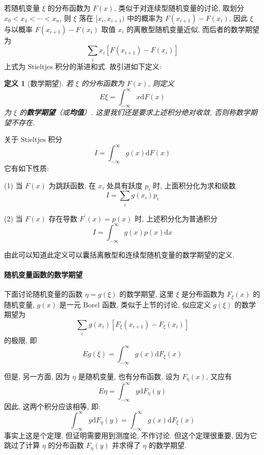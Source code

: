 \documentclass[12pt,a4paper]{article}
\newtheorem{definition}{定义}[subsection] %
\begin{document}
若随机变量 $\xi$ 的分布函数为 $F(x)$, 类似于对连续型随机变量的讨论, 取划分 $x_0 < x_1< \cdots< x_n$, 则 $\xi$ 落在
$[x_i, x_{i+1})$ 中的概率为 $F(x_{i+1})-F(x_i)$, 因此 $\xi$ 与以概率 $F(x_{i+1}) - F(x_i)$ 取值 $x_i$ 的离散型随机变量近似, 而后者的数学期望为
\[\sum\limits_i x_i[F(x_{i+1}) - F(x_i)]\]
上式为 $\mathrm{Stieltjes}$ 积分的渐进和式. 故引进如下定义:
\begin{definition}[数学期望]
    若 $\xi$ 的分布函数为 $F(x)$, 则定义 \[E\xi = \int_{-\infty}^{\infty} x \mathrm{d}F(x)\]
    为 $\xi$ 的\textbf{数学期望}（或\textbf{均值}）. 这里我们还是要求上述积分绝对收敛, 否则称数学期望不存在.
\end{definition}
关于 $\mathrm{Stieltjes}$ 积分 \[I = \int_{-\infty}^{\infty} g(x) \mathrm{d}F(x)\] 它有如下性质:

(1) 当 $F(x)$ 为跳跃函数, 在 $x_i$ 处具有跃度 $p_i$ 时, 上面积分化为求和级数\[I = \sum\limits_{i} g(x_i)p_i\]

(2) 当 $F(x)$ 存在导数 $F^{\prime}(x) = p(x)$ 时, 上述积分化为普通积分\[I = \int_{-\infty}^{\infty} g(x)p(x) \mathrm{d}x\]

由此可以知道此定义可以囊括离散型和连续型随机变量的数学期望的定义.

\paragraph{随机变量函数的数学期望}
下面讨论随机变量的函数 $\eta = g(\xi)$ 的数学期望, 这里 $\xi$ 是分布函数为 $F_{\xi}(x)$ 的随机变量, $g(x)$ 是一元 $\mathrm{Borel}$ 函数, 
类似于上节的讨论, 似应定义 $g(\xi)$ 的数学期望为 \[\sum\limits_{i} g(x_i) [F_{\xi}(x_{i+1}) - F_{\xi}(x_i) ]\] 的极限, 即
\[ E g(\xi) = \int_{-\infty}^{\infty} g(x)\mathrm{d}F_{\xi}(x) \]

但是, 另一方面, 因为 $\eta$ 是随机变量, 也有分布函数, 设为 $F_{\eta}(x)$, 又应有 \[E\eta = \int_{-\infty}^{\infty} y\mathrm{d}F_{\eta}(y)\]
因此, 这两个积分应该相等, 即:\[\int_{-\infty}^{\infty} y \mathrm{d}F_{\eta}(y) = \int_{-\infty}^{\infty} g(x) \mathrm{d}F_{\xi}(x)\]
事实上这是个定理, 但证明需要用到测度论, 不作讨论. 但这个定理很重要, 因为它跳过了计算 $\eta$ 的分布函数 $F_{\eta}(y)$ 并求得了 $\eta$ 的数学期望.
\end{document}
